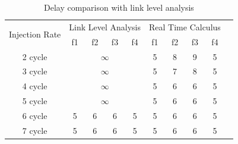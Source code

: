\documentclass[10pt,journal]{IEEEtran}
\begin{document}
\begin{table}[htbp]
\centering
\caption{\label{LLAvsRTC}Delay comparison with link level analysis}
\begin{tabular}{|c|c|c|c|c|c|c|c|c|c|}
\hline
\multirow{2}{*}{Injection Rate}  & \multicolumn{4}{|c|}{Link Level Analysis} & \multicolumn{4}{|c|}{Real Time Calculus} \\
\cline{2-9}
& f1 & f2 & f3 & f4 & f1 & f2 & f3 & f4\\
\hline\hline
2 cycle & \multicolumn{4}{|c|}{$\infty$} & 5 & 8 & 9 & 5\\
\hline
3 cycle & \multicolumn{4}{|c|}{$\infty$} & 5 & 7 & 8 & 5\\
\hline
4 cycle & \multicolumn{4}{|c|}{$\infty$} & 5 & 6 & 6 & 5\\
\hline
5 cycle & \multicolumn{4}{|c|}{$\infty$} & 5 & 6 & 6 & 5\\
\hline
6 cycle & 5 & 6 & 6 & 5 & 5 & 6 & 6 & 5\\
\hline
7 cycle & 5 & 6 & 6 & 5 & 5 & 6 & 6 & 5\\
\hline
\end{tabular}
\end{table}
\end{document}
